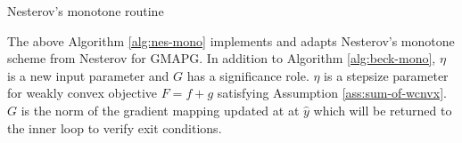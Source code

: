 \documentclass[12pt]{report}
\begin{document}
            \begin{algorithm}[H]
                \begin{algorithmic}[1]
                        \ENDIF
                    \ENDFOR
                    \caption{Nesterov's monotone routine}\label{alg:nes-mono}
                \end{algorithmic}
            \end{algorithm}
            \par
            The above Algorithm \ref{alg:nes-mono} implements and adapts Nesterov's monotone scheme from Nesterov \cite[2.2.32]{nesterov_lectures_2018} for GMAPG. 
            In addition to Algorithm \ref{alg:beck-mono}, $\eta$ is a new input parameter and $G$ has a significance role. 
            $\eta$ is a stepsize parameter for weakly convex objective $F = f + g$ satisfying Assumption \ref{ass:sum-of-wcnvx}. 
            $G$ is the norm of the gradient mapping updated at at $\hat y$ which will be returned to the inner loop to verify exit conditions. 
        
\end{document}

